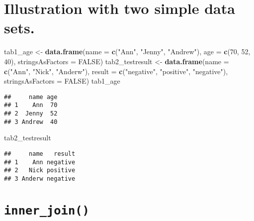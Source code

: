 \documentclass[]{article}
\newenvironment{Shaded}{\begin{snugshade}}{\end{snugshade}}
\newcommand{\DataTypeTok}[1]{\textcolor[rgb]{0.13,0.29,0.53}{#1}}
\newcommand{\DecValTok}[1]{\textcolor[rgb]{0.00,0.00,0.81}{#1}}
\newcommand{\KeywordTok}[1]{\textcolor[rgb]{0.13,0.29,0.53}{\textbf{#1}}}
\newcommand{\NormalTok}[1]{#1}
\newcommand{\OtherTok}[1]{\textcolor[rgb]{0.56,0.35,0.01}{#1}}
\newcommand{\StringTok}[1]{\textcolor[rgb]{0.31,0.60,0.02}{#1}}
\begin{document}
\hypertarget{illustration-with-two-simple-data-sets.}{%
\section{Illustration with two simple data
sets.}\label{illustration-with-two-simple-data-sets.}}

\begin{Shaded}
\begin{Highlighting}[]
\NormalTok{tab1_age <-}\StringTok{ }\KeywordTok{data.frame}\NormalTok{(}\DataTypeTok{name =} \KeywordTok{c}\NormalTok{(}\StringTok{"Ann"}\NormalTok{, }\StringTok{"Jenny"}\NormalTok{, }\StringTok{"Andrew"}\NormalTok{), }
                  \DataTypeTok{age =} \KeywordTok{c}\NormalTok{(}\DecValTok{70}\NormalTok{, }\DecValTok{52}\NormalTok{, }\DecValTok{40}\NormalTok{),}
                  \DataTypeTok{stringsAsFactors =} \OtherTok{FALSE}\NormalTok{)}
\NormalTok{tab2_testresult <-}\StringTok{ }\KeywordTok{data.frame}\NormalTok{(}\DataTypeTok{name =} \KeywordTok{c}\NormalTok{(}\StringTok{"Ann"}\NormalTok{, }\StringTok{"Nick"}\NormalTok{, }\StringTok{"Anderw"}\NormalTok{),}
                  \DataTypeTok{result =} \KeywordTok{c}\NormalTok{(}\StringTok{"negative"}\NormalTok{, }\StringTok{"positive"}\NormalTok{, }\StringTok{"negative"}\NormalTok{),}
                  \DataTypeTok{stringsAsFactors =} \OtherTok{FALSE}\NormalTok{)}
\NormalTok{tab1_age}
\end{Highlighting}
\end{Shaded}

\begin{verbatim}
##     name age
## 1    Ann  70
## 2  Jenny  52
## 3 Andrew  40
\end{verbatim}

\begin{Shaded}
\begin{Highlighting}[]
\NormalTok{tab2_testresult}
\end{Highlighting}
\end{Shaded}

\begin{verbatim}
##     name   result
## 1    Ann negative
## 2   Nick positive
## 3 Anderw negative
\end{verbatim}

\hypertarget{inner_join}{%
\section{\texorpdfstring{\texttt{inner\_join()}}{inner\_join()}}\label{inner_join}}
\end{document}
